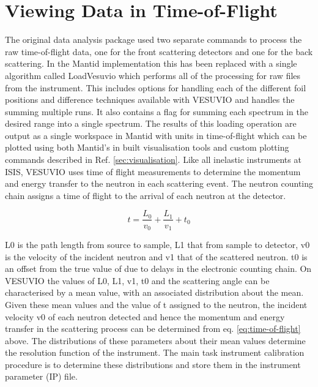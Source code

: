 \documentclass[paper=a4, fontsize=11pt]{scrartcl}	%
\numberwithin{equation}{section}															%
\numberwithin{figure}{section}																%
\numberwithin{table}{section}
\begin{document}
\section{Viewing Data in Time-of-Flight}
\label{sec:viewtof}
The original data analysis package \cite{mayers2010user} used two separate commands to process the raw time-of-flight data, one for the front scattering detectors and one for the back scattering. In the Mantid implementation this has been replaced with a single algorithm called LoadVesuvio which performs all of the processing for raw files from the instrument. This includes options for handling each of the different foil positions and difference techniques available with VESUVIO \citep{schooneveld2006foil, mayers2004vesuvio} and handles the summing multiple runs. It also contains a flag for summing each spectrum in the desired range into a single spectrum. The results of this loading operation are output as a single workspace in Mantid with units in time-of-flight which can be plotted using both Mantid's in built visualisation tools and custom plotting commands described in Ref. \ref{sec:visualisation}. Like all inelastic instruments at ISIS, VESUVIO uses time of flight measurements to determine the momentum and energy transfer to the neutron in each scattering event. The neutron counting chain assigns a time of flight to the arrival of each neutron at the detector.

\begin{equation}
\label{eq:time-of-flight}
t = \frac{L_0}{v_0} + \frac{L_1}{v_1} + t_0
\end{equation}

L0 is the path length from source to sample, L1 that from sample to detector, v0 is the velocity of the incident neutron and v1 that of the scattered neutron. t0 is an offset from the true value of due to delays in the electronic counting chain. On VESUVIO the values of L0, L1, v1, t0 and the scattering angle can be characterised by a mean value, with an associated distribution about the mean. Given these mean values and the value of t assigned to the neutron, the incident velocity v0 of each neutron detected and hence the
momentum and energy transfer in the scattering process can be determined from eq. \ref{eq:time-of-flight} above. The distributions of these parameters about their mean values determine the resolution function of the instrument. The main task instrument calibration procedure is to determine these distributions and store them in the instrument parameter (IP) file.
\end{document}
